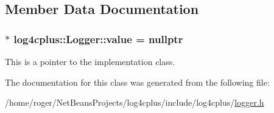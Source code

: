 \subsection{Member Data Documentation}
\hypertarget{classlog4cplus_1_1Logger_ad8290505934468f38e7c1cb388741e0c}{
\subsubsection[{value}]{$\ast$ log4cplus\-::\-Logger\-::value = nullptr\hspace{0.3cm}{\ttfamily [protected]}}}\label{classlog4cplus_1_1Logger_ad8290505934468f38e7c1cb388741e0c}
This is a pointer to the implementation class. 

The documentation for this class was generated from the following file\-:\begin{DoxyCompactItemize}
\item 
/home/roger/\-Net\-Beans\-Projects/log4cplus/include/log4cplus/\hyperlink{logger_8h}{logger.\-h}\end{DoxyCompactItemize}
